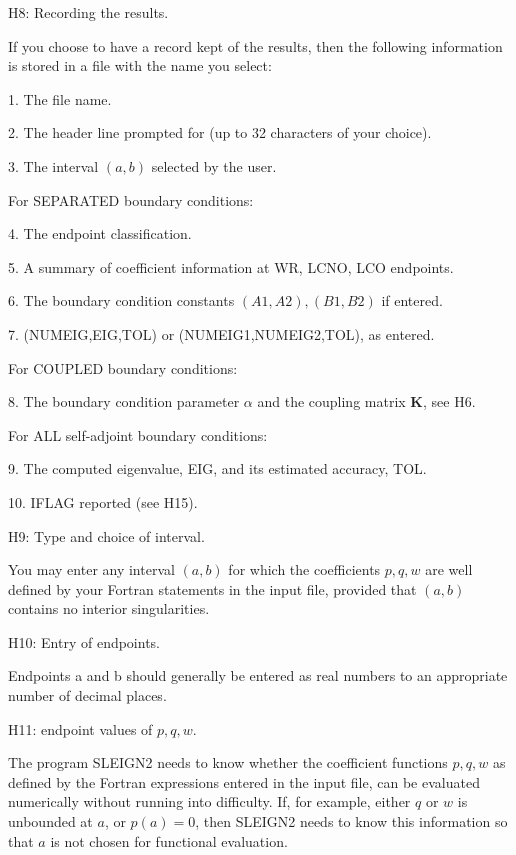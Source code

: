 \documentclass[12pt]{amsart}%
\theoremstyle{plain}
\numberwithin{equation}{section}
\numberwithin{theorem}{section}
\begin{document}
\medskip

H8: Recording the results.

If you choose to have a record kept of the results, then the following
information is stored in a file with the name you select:

1. The file name.

2. The header line prompted for (up to 32 characters of your choice).

3. The interval $(a,b)$ selected by the user.

For SEPARATED boundary conditions:

4. The endpoint classification.

5. A summary of coefficient information at WR, LCNO, LCO endpoints.

6. The boundary condition constants $(A1,A2),(B1,B2)$ if entered.

7. (NUMEIG,EIG,TOL) or (NUMEIG1,NUMEIG2,TOL), as entered.

For COUPLED boundary conditions:

8. The boundary condition parameter $\alpha$ and the coupling matrix
$\mathbf{K}$, see H6.

For ALL self-adjoint boundary conditions:

9. The computed eigenvalue, EIG, and its estimated accuracy, TOL.

10. IFLAG reported (see H15).

\medskip

H9: Type and choice of interval.

You may enter any interval $(a,b)$ for which the coefficients $p,q,w$ are well
defined by your Fortran statements in the input file, provided that $(a,b)$
contains no interior singularities.

\medskip

H10: Entry of endpoints.

Endpoints a and b should generally be entered as real numbers to an
appropriate number of decimal places.

\medskip

H11: endpoint values of $p,q,w.$

The program SLEIGN2 needs to know whether the coefficient functions $p,q,w$ as
defined by the Fortran expressions entered in the input file, can be evaluated
numerically without running into difficulty. If, for example, either $q$ or
$w$ is unbounded at $a$, or $p(a)=0$, then SLEIGN2 needs to know this
information so that $a$ is not chosen for functional evaluation.
\end{document}
